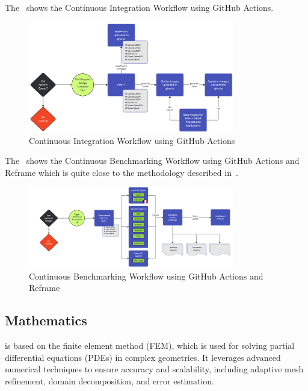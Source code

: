     The~ shows the \Feelpp Continuous Integration Workflow using GitHub Actions.
    \begin{figure}
        \centering
        \includegraphics[width=0.8\textwidth]{graphics/feelpp/feelpp-ci-workflow.png}
        \caption{\Feelpp Continuous Integration Workflow using GitHub Actions}
        \label{fig:feelpp-ci}
    \end{figure}

    The~ shows the \Feelpp Continuous Benchmarking Workflow using GitHub Actions and Reframe which is quite close to the methodology described in~.
    \begin{figure}
        \centering
        \includegraphics[width=0.8\textwidth]{graphics/feelpp/feelpp-cb-workflow.png}
        \caption{\Feelpp Continuous Benchmarking Workflow using GitHub Actions and Reframe}
        \label{fig:feelpp-cb}
    \end{figure}

\subsection{Mathematics}
\label{sec:Feelpp:mathematics}
\Feelpp is based on the finite element method (FEM), which is used for solving partial differential equations (PDEs) in complex geometries.
It leverages advanced numerical techniques to ensure accuracy and scalability, including adaptive mesh refinement, domain decomposition, and error estimation.

